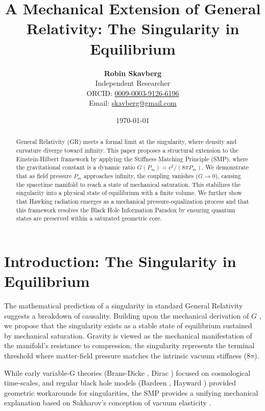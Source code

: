 \documentclass[11pt,letterpaper]{article}
\title{\textbf{A Mechanical Extension of General Relativity: The Singularity in Equilibrium}}
\author{
    \textbf{Robin Skavberg} \\
    \small Independent Researcher \\
    \small ORCID: \href{https://orcid.org/0009-0003-9126-6196}{0009-0003-9126-6196} \\
    \small Email: \href{mailto:skavberg@gmail.com}{skavberg@gmail.com}
}
\date{\today}
\begin{document}
\maketitle

\begin{abstract}
General Relativity (GR) meets a formal limit at the singularity, where density and curvature diverge toward infinity. This paper proposes a structural extension to the Einstein-Hilbert framework by applying the Stiffness Matching Principle (SMP), where the gravitational constant is a dynamic ratio $G(P_m) = c^2 / (8\pi P_m)$. We demonstrate that as field pressure $P_m$ approaches infinity, the coupling vanishes ($G \to 0$), causing the spacetime manifold to reach a state of mechanical saturation. This stabilizes the singularity into a physical state of equilibrium with a finite volume. We further show that Hawking radiation emerges as a mechanical pressure-equalization process and that this framework resolves the Black Hole Information Paradox by ensuring quantum states are preserved within a saturated geometric core.
\end{abstract}

\section{Introduction: The Singularity in Equilibrium}

The mathematical prediction of a singularity in standard General Relativity suggests a breakdown of causality. Building upon the mechanical derivation of $G$ \cite{Skavberg2026}, we propose that the singularity exists as a stable state of equilibrium sustained by mechanical saturation. Gravity is viewed as the mechanical manifestation of the manifold's resistance to compression; the singularity represents the terminal threshold where matter-field pressure matches the intrinsic vacuum stiffness ($8\pi$).

While early variable-G theories (Brans-Dicke \cite{BransDicke1961}, Dirac \cite{Dirac1937}) focused on cosmological time-scales, and regular black hole models (Bardeen \cite{Bardeen1968}, Hayward \cite{Hayward2006}) provided geometric workarounds for singularities, the SMP \cite{Skavberg2026} provides a unifying mechanical explanation based on Sakharov’s conception of vacuum elasticity \cite{Sakharov1967}.
\end{document}

